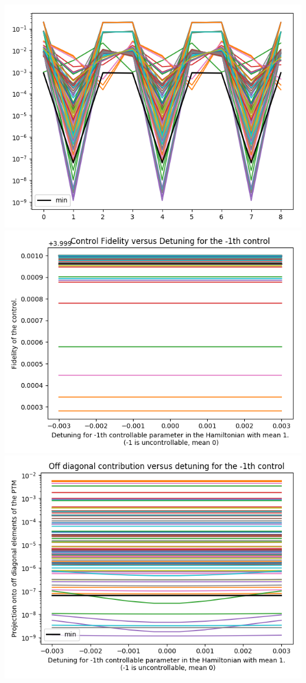 \documentclass{article}
\begin{document}
\begin{center}
\includegraphics[scale=.9]{report_pickled_controls20/control_dpn_all}
\includegraphics[scale=.9]{control_fid_0}
\includegraphics[scale=.9]{off_diag_0}

\end{center}
\end{document}
